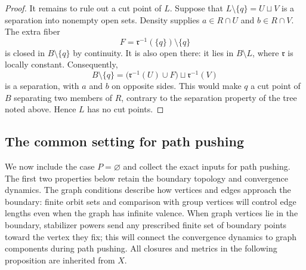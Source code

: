 \begin{proof}
It remains to rule out a cut point of $L$.  Suppose that
$L\setminus\{q\}=U\sqcup V$ is a separation into nonempty open sets.
Density supplies $a\in R\cap U$ and $b\in R\cap V$.  The extra fiber
\[
  F=\mathfrak r^{-1}(\{q\})\setminus\{q\}
\]
is closed in $B\setminus\{q\}$ by continuity.  It is also open there:
it lies in $B\setminus L$, where $\mathfrak r$ is locally constant.
Consequently,
\[
 B\setminus\{q\}
   =\bigl(\mathfrak r^{-1}(U)\cup F\bigr)
      \sqcup\mathfrak r^{-1}(V)
\]
is a separation, with $a$ and $b$ on opposite sides.  This would make
$q$ a cut point of $B$ separating two members of $R$, contrary to the
separation property of the tree noted above.  Hence $L$ has no cut
points.
\end{proof}

\subsection{The common setting for path pushing}

We now include the case $P=\varnothing$ and collect the exact inputs
for path pushing. The first two properties below retain the boundary
topology and convergence dynamics. The graph conditions describe how
vertices and edges approach the boundary: finite orbit sets and comparison
with group vertices will control edge lengths even when the graph has
infinite valence. When graph vertices lie in the boundary, stabilizer
powers send any prescribed finite set of boundary points toward the
vertex they fix; this will connect
the convergence dynamics to graph components during path pushing.
All closures and metrics in the following proposition are inherited
from $X$.

